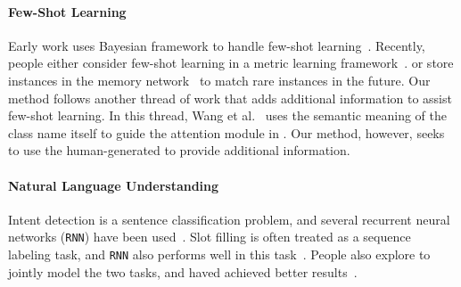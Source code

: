 \paragraph{Few-Shot Learning}
Early work uses Bayesian framework to handle few-shot learning~\cite{fei2006one}. Recently, people either consider few-shot learning in a metric learning framework~\cite{koch2015siamese,vinyals2016matching}. or store instances in the memory network~\cite{santoro2016meta, kaiser2017learning} to match rare instances in the future.
Our method follows another thread of work that adds additional information to assist few-shot learning.
In this thread, Wang et al.~ uses the semantic meaning of the class name itself to guide the attention module in \NN. 
Our method, however, seeks to use the human-generated \RE to provide additional information.

\paragraph{Natural Language Understanding}
Intent detection is a sentence classification problem, and several recurrent neural networks (\texttt{RNN}) have been used~\cite{ravuri2015comparative}.
Slot filling is often treated as a sequence labeling task, and \texttt{RNN} also performs well in this task~\cite{mesnil2015using}. 
People also explore to jointly model the two tasks, and haved achieved better results~\cite{liu2016attention, zhang2016joint}.



